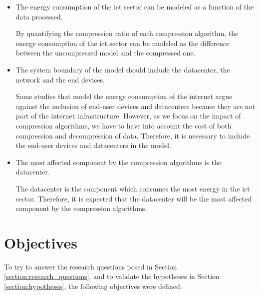 \begin{itemize}
    \item The energy consumption of the \ac{ict} sector can be modeled as a function of the data processed.

    By quantifying the compression ratio of each compression algorithm, the energy consumption of the \ac{ict} sector can be modeled as the difference between the uncompressed model and the compressed one.
    
    \item The system boundary of the model should include the datacenter, the network and the end devices. 
    
    Some studies that model the energy consumption of the internet argue against the inclusion of end-user devices and datacenters because they are not part of the internet infrastructure. However, as we focus on the impact of compression algorithms, we have to have into account the cost of both compression and decompression of data. Therefore, it is necessary to include the end-user devices and datacenters in the model.

    \item The most affected component by the compression algorithms is the datacenter.

    The datacenter is the component which consumes the most energy in the \ac{ict} sector. Therefore, it is expected that the datacenter will be the most affected component by the compression algorithms.

\end{itemize}


\section{Objectives}

To try to answer the research questions posed in Section \ref{section:research_questions}, and to validate the hypotheses in Section \ref{section:hypotheses}, the following objectives were defined:

